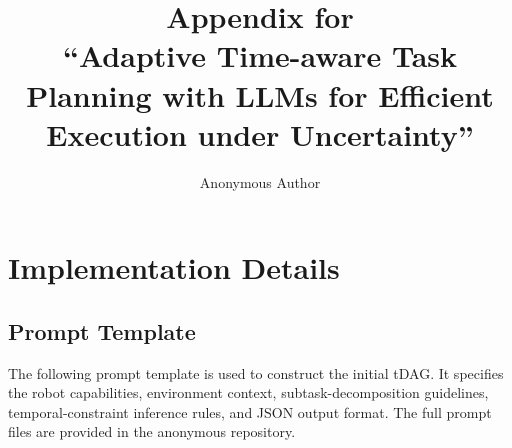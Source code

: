 \documentclass[letterpaper,10pt,onecolumn]{IEEEtran}
\newcommand{\quotes}[1]{``#1''}
\begin{document}
\title{Appendix for\\
\quotes{Adaptive Time-aware Task Planning with LLMs for Efficient Execution under Uncertainty}}
\author{Anonymous Author}
\maketitle
\setcounter{tocdepth}{2}
\tableofcontents
\newpage
\section{Implementation Details}
\label{supp:prompt}

\subsection{Prompt Template}
The following prompt template is used to construct the initial tDAG.
It specifies the robot capabilities, environment context, subtask-decomposition
guidelines, temporal-constraint inference rules, and JSON output format. The full prompt files are provided in the anonymous repository.
\end{document}
